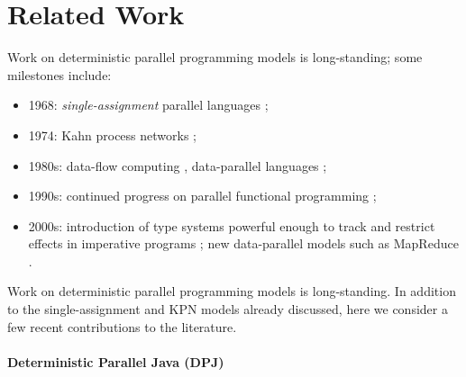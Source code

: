 \section{Related Work}
\label{section:related}

Work on deterministic parallel programming
models is long-standing; some milestones include:

\begin{itemize}
\item 1968: {\em single-assignment} parallel languages \cite{Tesler-1968};
\item 1974: Kahn process networks \cite{Kahn-1974};
\item 1980s: data-flow computing \cite{IStructures}, data-parallel
              languages \cite{Sabot_Paralation};
\item 1990s: continued progress on parallel functional programming 
      \cite{ph,blelloch_something,hammond_par_90s};
\item 2000s: introduction of type systems powerful enough to track
  and restrict effects in imperative programs \cite{par_by_default};
  new data-parallel models such as MapReduce \cite{MapReduce}.
\end{itemize}
\fi{}

Work on deterministic parallel programming
models is long-standing.
In addition to the single-assignment and KPN models already
discussed, here we consider a few recent contributions to the literature.

\paragraph{Deterministic Parallel Java (DPJ)}


